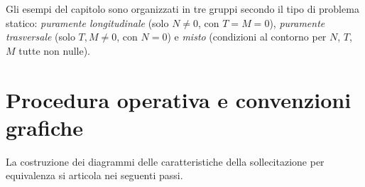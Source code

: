 Gli esempi del capitolo sono organizzati in tre
gruppi secondo il tipo di problema statico:
\emph{puramente longitudinale} (solo $N \neq 0$,
con $T = M = 0$), \emph{puramente trasversale}
(solo $T, M \neq 0$, con $N = 0$) e \emph{misto}
(condizioni al contorno per $N$, $T$, $M$ tutte
non nulle).





\section{Procedura operativa e convenzioni grafiche}
\label{sec:procedura_operativa}

La costruzione dei diagrammi delle caratteristiche
della sollecitazione per equivalenza si articola
nei seguenti passi.

